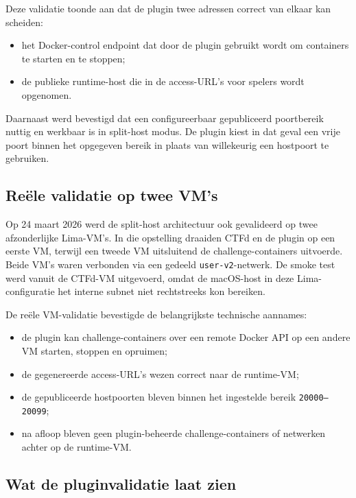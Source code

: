 Deze validatie toonde aan dat de plugin twee adressen correct van elkaar kan scheiden:

\begin{itemize}
  \item het Docker-control endpoint dat door de plugin gebruikt wordt om containers te starten en te stoppen;
  \item de publieke runtime-host die in de access-URL's voor spelers wordt opgenomen.
\end{itemize}

Daarnaast werd bevestigd dat een configureerbaar gepubliceerd poortbereik nuttig en werkbaar is in split-host modus. De plugin kiest in dat geval een vrije poort binnen het opgegeven bereik in plaats van willekeurig een hostpoort te gebruiken.

\subsection{Re\"ele validatie op twee VM's}

Op 24 maart 2026 werd de split-host architectuur ook gevalideerd op twee afzonderlijke Lima-VM's. In die opstelling draaiden CTFd en de plugin op een eerste VM, terwijl een tweede VM uitsluitend de challenge-containers uitvoerde. Beide VM's waren verbonden via een gedeeld \texttt{user-v2}-netwerk. De smoke test werd vanuit de CTFd-VM uitgevoerd, omdat de macOS-host in deze Lima-configuratie het interne subnet niet rechtstreeks kon bereiken.

De re\"ele VM-validatie bevestigde de belangrijkste technische aannames:

\begin{itemize}
  \item de plugin kan challenge-containers over een remote Docker API op een andere VM starten, stoppen en opruimen;
  \item de gegenereerde access-URL's wezen correct naar de runtime-VM;
  \item de gepubliceerde hostpoorten bleven binnen het ingestelde bereik \texttt{20000--20099};
  \item na afloop bleven geen plugin-beheerde challenge-containers of netwerken achter op de runtime-VM.
\end{itemize}

\subsection{Wat de pluginvalidatie laat zien}


